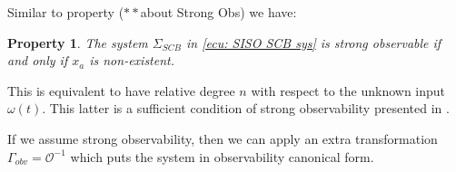 \documentclass[11pt,letterpaper,twoside,openright]{report}
\newtheorem{definition}{Definition}[chapter]
\newtheorem{property}{Property}[chapter]
\begin{document}
Similar to property ($**$about Strong Obs) we have:
\begin{property}\label{prop: CH3 S observability}
	The system $\Sigma_{SCB}$ in \eqref{ecu: SISO SCB sys} is strong observable if and only if $x_a$ is non-existent.
\end{property}

%
%
%

This is equivalent to have relative degree $n$ with respect to the unknown input $\omega(t)$. This latter is a sufficient condition of strong observability presented in \cite{Fridman2006}. 

If we assume strong observability, then we can apply an extra transformation $\Gamma_{obv}=\mathcal{O}^{-1}$ which puts the system in observability canonical form.
\end{document}
